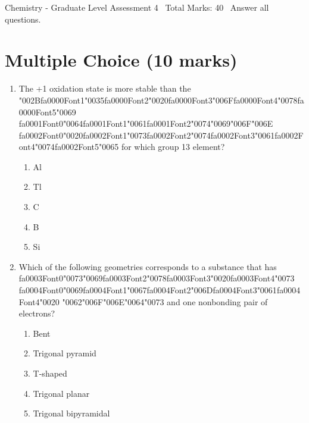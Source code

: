 \documentclass[12pt]{article}
\begin{document}
\begin{center}
Chemistry - Graduate Level Assessment 4 \
Total Marks: 40 \
Answer all questions.
\end{center}

\section*{Multiple Choice (10 marks)}
\begin{enumerate}[label=\arabic*.]
\item The +1 oxidation state is more stable than the {\char"002B}{\csname fa0000Font1\endcsname\char"0035}{\csname fa0000Font2\endcsname\char"0020}{\csname fa0000Font3\endcsname\char"006F}{\csname fa0000Font4\endcsname\char"0078}{\csname fa0000Font5\endcsname\char"0069} {\csname fa0001Font0\endcsname\char"0064}{\csname fa0001Font1\endcsname\char"0061}{\csname fa0001Font2\endcsname\char"0074}{\char"0069}{\char"006F}{\char"006E} {\csname fa0002Font0\endcsname\char"0020}{\csname fa0002Font1\endcsname\char"0073}{\csname fa0002Font2\endcsname\char"0074}{\csname fa0002Font3\endcsname\char"0061}{\csname fa0002Font4\endcsname\char"0074}{\csname fa0002Font5\endcsname\char"0065} for which group 13
element?
\begin{enumerate}[label=(\alph*)]
    \item Al
    \item Tl
    \item C
    \item B
    \item Si
\end{enumerate}
\item Which of the following geometries corresponds to a substance that has {\csname fa0003Font0\endcsname\char"0073}{\char"0069}{\csname fa0003Font2\endcsname\char"0078}{\csname fa0003Font3\endcsname\char"0020}{\csname fa0003Font4\endcsname\char"0073} {\csname fa0004Font0\endcsname\char"0069}{\csname fa0004Font1\endcsname\char"0067}{\csname fa0004Font2\endcsname\char"006D}{\csname fa0004Font3\endcsname\char"0061}{\csname fa0004Font4\endcsname\char"0020} {\char"0062}{\char"006F}{\char"006E}{\char"0064}{\char"0073} and
one nonbonding pair of electrons?
\begin{enumerate}[label=(\alph*)]
    \item Bent
    \item Trigonal pyramid
    \item T-shaped
    \item Trigonal planar
    \item Trigonal bipyramidal

\end{enumerate}
\end{enumerate}
\end{document}
